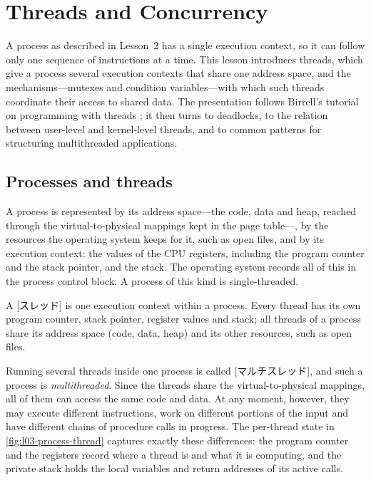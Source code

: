 \documentclass[../main.tex]{subfiles}
\begin{document}
\chapter{Threads and Concurrency}

A process as described in Lesson~2 has a single execution context, so it
can follow only one sequence of instructions at a time.  This lesson
introduces threads, which give a process several execution contexts that
share one address space, and the mechanisms---mutexes and condition
variables---with which such threads coordinate their access to shared data.
The presentation follows Birrell's tutorial on programming with threads
\cite{birrell1989}; it then turns to deadlocks, to the relation between
user-level and kernel-level threads, and to common patterns for structuring
multithreaded applications.

\section{Processes and threads}
\label{sec:l03-threads}

A process is represented by its address space---the code, data and heap,
reached through the virtual-to-physical mappings kept in the page
table---, by the resources the operating system keeps for it, such as open
files, and by its execution context: the values of the CPU registers,
including the program counter and the stack pointer, and the
stack.  The operating system records all of this in the process control
block.  A process of this kind is single-threaded.

\begin{definition}[Thread]
  A [スレッド] is one execution context within a process.  Every
  thread has its own program counter, stack pointer, register values and
  stack; all threads of a process share its address space (code, data,
  heap) and its other resources, such as open files.
\end{definition}

Running several threads inside one process is called
[マルチスレッド], and such a process is
\emph{multithreaded}.  Since the threads share the virtual-to-physical
mappings, all of them can access the same code and data.  At any moment,
however, they may execute different instructions, work on different
portions of the input and have different chains of procedure calls in
progress.  The per-thread state in \cref{fig:l03-process-thread} captures
exactly these differences: the program counter and the registers record
where a thread is and what it is computing, and the private stack holds the
local variables and return addresses of its active calls.
\end{document}
